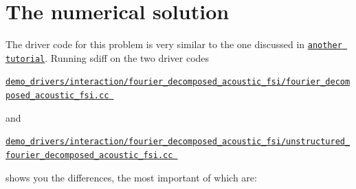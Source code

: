 \hypertarget{index_num}{}\section{The numerical solution}\label{index_num}
The driver code for this problem is very similar to the one discussed in \href{../../sphere/html/index.html}{\tt another tutorial}. Running {\ttfamily sdiff} on the two driver codes \begin{center} \href{../../../../demo_drivers/interaction/fourier_decomposed_acoustic_fsi/fourier_decomposed_acoustic_fsi.cc}{\tt demo\+\_\+drivers/interaction/fourier\+\_\+decomposed\+\_\+acoustic\+\_\+fsi/fourier\+\_\+decomposed\+\_\+acoustic\+\_\+fsi.\+cc } \end{center}  and \begin{center} \href{../../../../demo_drivers/interaction/fourier_decomposed_acoustic_fsi/unstructured_fourier_decomposed_acoustic_fsi.cc}{\tt demo\+\_\+drivers/interaction/fourier\+\_\+decomposed\+\_\+acoustic\+\_\+fsi/unstructured\+\_\+fourier\+\_\+decomposed\+\_\+acoustic\+\_\+fsi.\+cc } \end{center}  shows you the differences, the most important of which are\+:
